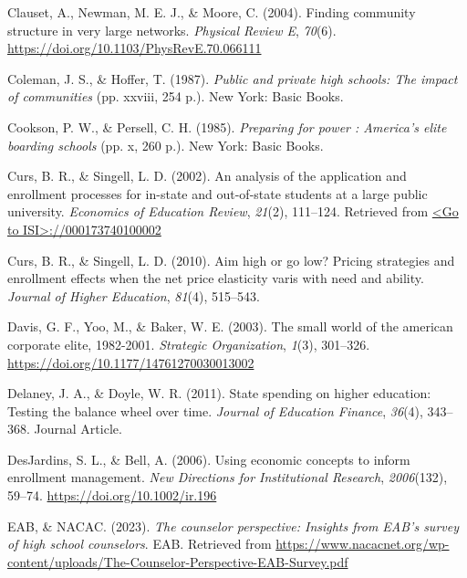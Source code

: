 \documentclass[
  12pt,
]{article}
\newlength{\cslhangindent}
\newlength{\cslentryspacingunit} %
\newenvironment{CSLReferences}[2] %
 {%
  \setlength{\parindent}{0pt}
  \ifodd #1
  \let\oldpar\par
  \def\par{\hangindent=\cslhangindent\oldpar}
  \fi
  \setlength{\parskip}{#2\cslentryspacingunit}
 }%
 {}
\begin{document}
\begin{CSLReferences}{1}{0}
\leavevmode{}%
Clauset, A., Newman, M. E. J., \& Moore, C. (2004). Finding community structure in very large networks. \emph{Physical Review E}, \emph{70}(6). \url{https://doi.org/10.1103/PhysRevE.70.066111}

\leavevmode{}%
Coleman, J. S., \& Hoffer, T. (1987). \emph{Public and private high schools: The impact of communities} (pp. xxviii, 254 p.). New York: Basic Books.

\leavevmode{}%
Cookson, P. W., \& Persell, C. H. (1985). \emph{Preparing for power : America's elite boarding schools} (pp. x, 260 p.). New York: Basic Books.

\leavevmode{}%
Curs, B. R., \& Singell, L. D. (2002). An analysis of the application and enrollment processes for in-state and out-of-state students at a large public university. \emph{Economics of Education Review}, \emph{21}(2), 111--124. Retrieved from \href{\%3CGo\%20to\%20ISI\%3E://000173740100002}{\textless Go to ISI\textgreater://000173740100002}

\leavevmode{}%
Curs, B. R., \& Singell, L. D. (2010). Aim high or go low? Pricing strategies and enrollment effects when the net price elasticity varis with need and ability. \emph{Journal of Higher Education}, \emph{81}(4), 515--543.

\leavevmode{}%
Davis, G. F., Yoo, M., \& Baker, W. E. (2003). The small world of the american corporate elite, 1982-2001. \emph{Strategic Organization}, \emph{1}(3), 301--326. \url{https://doi.org/10.1177/14761270030013002}

\leavevmode{}%
Delaney, J. A., \& Doyle, W. R. (2011). State spending on higher education: Testing the balance wheel over time. \emph{Journal of Education Finance}, \emph{36}(4), 343--368. Journal Article.

\leavevmode{}%
DesJardins, S. L., \& Bell, A. (2006). Using economic concepts to inform enrollment management. \emph{New Directions for Institutional Research}, \emph{2006}(132), 59--74. \url{https://doi.org/10.1002/ir.196}

\leavevmode{}%
EAB, \& NACAC. (2023). \emph{The counselor perspective: Insights from EAB's survey of high school counselors}. EAB. Retrieved from \url{https://www.nacacnet.org/wp-content/uploads/The-Counselor-Perspective-EAB-Survey.pdf}


\end{CSLReferences}
\end{document}
